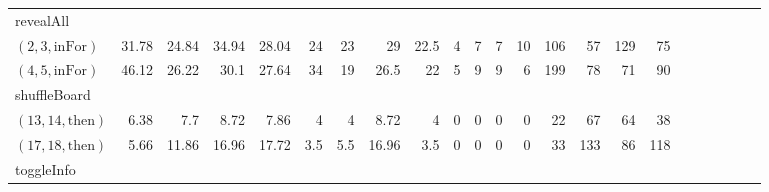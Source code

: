 \documentclass[sigconf]{acmart}
\newcommand{\thenBr}{\text{then}}
\newcommand{\elseBr}{\text{else}}
\newcommand{\inFor}{\text{inFor}}
\newcommand{\inWhile}{\text{inWhile}}
\begin{document}
\begin{table*}
{\begin{tabular}{l|rrrr|rrrr|rrrr|rrrr|r|r|r|r|r|r}
    \midrule
    revealAll         &             &             &                &               &       &       &         &         &          &          &            &             &          &         &            & \\
    $(2,3,\inFor)$    & 31.78       & 24.84       & 34.94          & 28.04         & 24    & 23    & 29      & 22.5    & 4        & 7        & 7          & 10          & 106      & 57      & 129        & 75 & & & & & & \\
    $(4,5,\inFor)$    & 46.12       & 26.22       & 30.1           & 27.64         & 34    & 19    & 26.5    & 22      & 5        & 9        & 9          & 6           & 199      & 78      & 71         & 90 & & & & & & \\
    \midrule
    shuffleBoard      &             &             &                &               &       &       &         &         &          &          &            &             &          &         &            & & & & & & &\\
    $(13,14,\thenBr)$ & 6.38        & 7.7         & 8.72           & 7.86          & 4     & 4     & 8.72    & 4       & 0        & 0        & 0          & 0           & 22       & 67      & 64         & 38 & & & & & & \\
    $(17,18,\thenBr)$ & 5.66        & 11.86       & 16.96          & 17.72         & 3.5   & 5.5   & 16.96   & 3.5     & 0        & 0        & 0          & 0           & 33       & 133     & 86         & 118 & & & & & & \\
    \midrule
    \midrule
    toggleInfo        &             &             &                &               &       &       &         &         &          &          &            &             &          &         &            & \\

\end{tabular}}
\end{table*}
\end{document}
